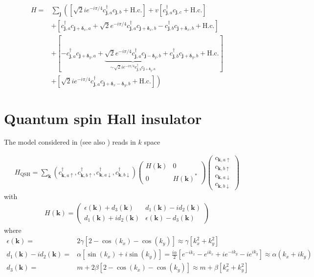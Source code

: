 \documentclass[english]{scrartcl}
\begin{document}
\begin{align*}
H = & \sum_{\bm j} \left ( \left [\sqrt{2}i e^{-i \pi /4} c^\dagger_{\bm{j},  a} c_{\bm{j},  b} + \text{H.c.}\right ] + v \left [ c^\dagger_{\bm{j},  a} c_{\bm{j}, c} + \text{H.c.}\right ] \right . \\
& + \left [c^\dagger_{\bm{j},  a} c_{\bm{j} + \bm \delta_x,  a} + \sqrt{2} e^{- i \pi /4} c^\dagger_{\bm{j},  a} c_{\bm{j} + \bm \delta_x,  b} - c^\dagger_{\bm{j},  b} c_{\bm{j} + \bm \delta_x,  b} + \text{H.c.}\right ]  \\
& + \left [-c^\dagger_{\bm{j},  a} c_{\bm{j} + \bm \delta_y,  a} + \underbrace{\sqrt{2} e^{- i \pi /4} c^\dagger_{\bm{j},  a} c_{\bm{j} - \bm \delta_y,  b}}_{\sim \sqrt{2} ie^{- i \pi /4} c^\dagger_{\bm{j},  b} c_{\bm{j} + \bm \delta_y,  a}}+ c^\dagger_{\bm{j},  b} c_{\bm{j} + \bm \delta_y,  b} + \text{H.c.}\right ] \\
& \left.+ \left [ \sqrt{2} i e^{- i \pi /4} c^\dagger_{\bm{j},  a} c_{\bm{j} + \bm \delta_x - \bm \delta_y,  b} + \text{H.c.}\right ] \right ) 
\end{align*}

\section{Quantum spin Hall insulator}
The model considered in \cite{theory_TA} (see also \cite{QSH_Bernevig}) reads in $k$ space

\begin{align*}
H_\text{QSH} = \sum_{\bm k} (c^\dagger_{\bm{k},  a \uparrow}, c^\dagger_{\bm{k},  b \uparrow},  c^\dagger_{\bm{k},  a \downarrow}, c^\dagger_{\bm{k},  b \downarrow})
\begin{pmatrix} 
H(\bm k) & 0  \\
0 & H(\bm k)^* 
\end{pmatrix}
\begin{pmatrix}
c_{\bm{k},  a\uparrow}\\
c_{\bm{k},  b\uparrow}\\
c_{\bm{k},  a\downarrow} \\
c_{\bm{k},  b\downarrow}
\end{pmatrix}
\end{align*}
with 
\begin{align*}
H(\bm k) =
\begin{pmatrix}
\epsilon(\bm k) + d_3(\bm k) & d_1(\bm k) - i d_2(\bm k) \\
d_1(\bm k) + i d_2(\bm k) & \epsilon(\bm k) - d_3(\bm k)
\end{pmatrix}
\end{align*}
where 
\begin{align*}
\epsilon(\bm k) =& 2 \gamma [2 - \cos(k_x) - \cos(k_y)] \approx \gamma [k_x^2 + k_y^2] \\
d_1(\bm k) - i d_2(\bm k) = & \alpha [\sin(k_x)  + i\sin(k_y)] = \frac{i\alpha}{2} \left[e^{-i k_x} - e^{i k_x} + i e^{- i k_y} - i e^{i k_y} \right] \approx \alpha (k_x  + i k_y) \\
d_3(\bm k) = & m + 2 \beta[2 - \cos(k_x) -\cos(k_y)] \approx m + \beta[k_x^2 + k_y^2]
\end{align*}
\end{document}
